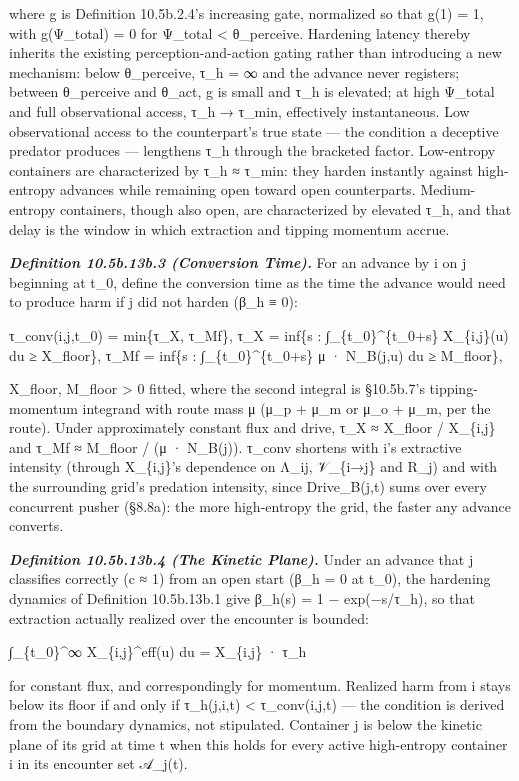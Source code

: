 \documentclass[
]{article}
\begin{document}
where g is Definition 10.5b.2.4's increasing gate, normalized so that
g(1) = 1, with g(Ψ\_total) = 0 for Ψ\_total \textless{} θ\_perceive.
Hardening latency thereby inherits the existing perception-and-action
gating rather than introducing a new mechanism: below θ\_perceive, τ\_h
= ∞ and the advance never registers; between θ\_perceive and θ\_act, g
is small and τ\_h is elevated; at high Ψ\_total and full observational
access, τ\_h → τ\_min, effectively instantaneous. Low observational
access to the counterpart's true state --- the condition a deceptive
predator produces --- lengthens τ\_h through the bracketed factor.
Low-entropy containers are characterized by τ\_h ≈ τ\_min: they harden
instantly against high-entropy advances while remaining open toward open
counterparts. Medium-entropy containers, though also open, are
characterized by elevated τ\_h, and that delay is the window in which
extraction and tipping momentum accrue.

\emph{\textbf{Definition 10.5b.13b.3 (Conversion Time).}} For an advance
by i on j beginning at t\_0, define the conversion time as the time the
advance would need to produce harm if j did not harden (β\_h ≡ 0):

τ\_conv(i,j,t\_0) = min\{τ\_X, τ\_Mf\}, τ\_X = inf\{s :
∫\_\{t\_0\}\^{}\{t\_0+s\} X\_\{i,j\}(u) du ≥ X\_floor\}, τ\_Mf = inf\{s
: ∫\_\{t\_0\}\^{}\{t\_0+s\} μ · N\_B(j,u) du ≥ M\_floor\},

X\_floor, M\_floor \textgreater{} 0 fitted, where the second integral is
§10.5b.7's tipping-momentum integrand with route mass μ (μ\_p + μ\_m or
μ\_o + μ\_m, per the route). Under approximately constant flux and
drive, τ\_X ≈ X\_floor / X\_\{i,j\} and τ\_Mf ≈ M\_floor / (μ ·
N\_B(j)). τ\_conv shortens with i's extractive intensity (through
X\_\{i,j\}'s dependence on Λ\_ij, 𝒱\_\{i→j\} and R\_j) and with the
surrounding grid's predation intensity, since Drive\_B(j,t) sums over
every concurrent pusher (§8.8a): the more high-entropy the grid, the
faster any advance converts.

\emph{\textbf{Definition 10.5b.13b.4 (The Kinetic Plane).}} Under an
advance that j classifies correctly (c ≈ 1) from an open start (β\_h = 0
at t\_0), the hardening dynamics of Definition 10.5b.13b.1 give β\_h(s)
= 1 − exp(−s/τ\_h), so that extraction actually realized over the
encounter is bounded:

∫\_\{t\_0\}\^{}∞ X\_\{i,j\}\^{}eff(u) du = X\_\{i,j\} · τ\_h

for constant flux, and correspondingly for momentum. Realized harm from
i stays below its floor if and only if τ\_h(j,i,t) \textless{}
τ\_conv(i,j,t) --- the condition is derived from the boundary dynamics,
not stipulated. Container j is below the kinetic plane of its grid at
time t when this holds for every active high-entropy container i in its
encounter set 𝒜\_j(t).
\end{document}
